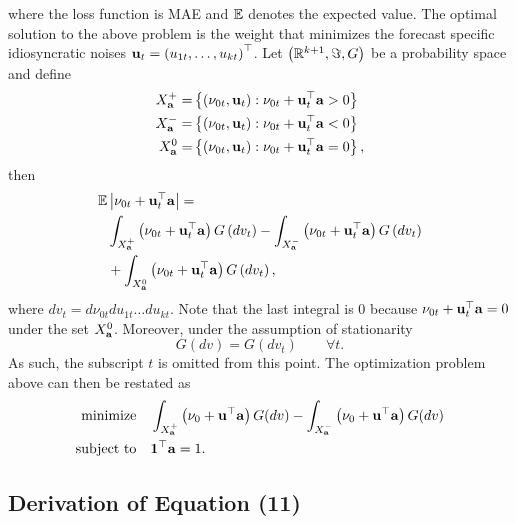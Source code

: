 \documentclass[a4paper, 11pt]{article}
\begin{document}
    \noindent where the loss function is MAE and $\mathbb{E}$ denotes the expected value. The optimal solution to the above problem is the weight that minimizes the forecast specific idiosyncratic noises $\mathbf{u}_t =\left ( u_{1t}, \ldots, u_{kt} \right )^{\top}$. Let $\left ( \mathbb{R}^{k+1}, \Im, G \right )$ be a probability space and define 
    \begin{align*}
        X^+_{\mathbf{a}} =& \left \{ (\nu_{0t}, \mathbf{u}_t ): \nu_{0t} + \mathbf{u}_t^\top\mathbf{a} > 0 \right \} \\ 
        X^-_{\mathbf{a}} =& \left \{ (\nu_{0t}, \mathbf{u}_t ): \nu_{0t} + \mathbf{u}_t^\top\mathbf{a} < 0 \right \} \\
        X^0_{\mathbf{a}} =& \left \{ (\nu_{0t}, \mathbf{u}_t ): \nu_{0t} + \mathbf{u}_t^\top\mathbf{a} = 0 \right \}, 
    \end{align*}
    then 
    \begin{equation*} 
        \begin{split} 
            \mathbb{E} & \left \vert \nu_{0t} + \mathbf{u}_t^\top \mathbf{a} \right \vert = \\
               &\int_{X^+_{\mathbf{a}}} \left (\nu_{0t} + \mathbf{u}_t^\top \mathbf{a} \right ) G \left (dv_t \right ) - \int_{X^-_{\mathbf{a}}} \left ( \nu_{0t} + \mathbf{u}_t^\top \mathbf{a} \right ) G \left ( dv_t \right ) \\
               &+  \int_{X^0_{\mathbf{a}}} \left (\nu_{0t} + \mathbf{u}_t^\top \mathbf{a} \right ) G \left ( dv_t \right ), 
        \end{split} 
    \end{equation*} 
    \noindent where $dv_t = d\nu_{0t}du_{1t}\ldots du_{kt}$. Note that the last integral is 0 because $\nu_{0t} + \mathbf{u}_t^\top \mathbf{a} = 0$ under the set $X^0_{\mathbf{a}}$. Moreover, under the assumption of stationarity 
    \begin{equation*} 
        G\left ( dv \right ) = G \left ( dv_t \right ) \qquad \forall t. 
    \end{equation*} 
    \noindent As such, the subscript $t$ is omitted from this point. The optimization problem above can then be restated as 
 \begin{equation*} \label{eq:main}
    \begin{split}
	\text{minimize} & \quad \int_{X^+_{\mathbf{a}}} \left ( \nu_0 + \mathbf{u}^\top \mathbf{a} \right ) G(dv) - \int_{X^-_{\mathbf{a}}} \left ( \nu_0 + \mathbf{u}^\top \mathbf{a} \right ) G(dv)  \\
	\text{subject to} & \quad \mathbf{1}^\top \mathbf{a} = 1. 
     \end{split}
\end{equation*}


\subsection{Derivation of Equation (11)}
\end{document}
